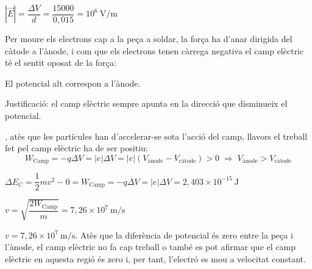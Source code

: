 \begin{solapartat}
 $|\vec{E}| = \dfrac{\Delta V}{d} = \dfrac{15000}{0,015} = 10^{6}\ \mathrm{V/m}$

 Per moure els electrons cap a la peça a soldar, la força ha d'anar dirigida del càtode a l'ànode, i com que els electrons tenen càrrega negativa el camp elèctric té el sentit oposat de la força:


 El potencial alt correspon a l'ànode.

Justificació: el camp elèctric sempre apunta en la direcció que disminueix el potencial.

, atès que les partícules han d'accelerar-se sota l'acció del camp, llavors el treball fet pel camp elèctric ha de ser positiu:
\[ W_\mathrm{Camp} = -q\Delta V = |e|\Delta V = |e|(V_\text{ànode} - V_\text{càtode}) > 0 \;\Rightarrow\; V_\text{ànode} > V_\text{càtode} \]
\end{solapartat}

\begin{solapartat}
 $\Delta E_C = \dfrac{1}{2}mv^2 - 0 = W_\mathrm{Camp} = -q\Delta V = |e|\Delta V = 2,403\times 10^{-15}\ \mathrm{J}$

 $v = \sqrt{\dfrac{2W_\mathrm{Camp}}{m}} = 7,26\times 10^{7}\ \mathrm{m/s}$

 $v = 7,26\times 10^{7}\ \mathrm{m/s}$. Atès que la diferència de potencial és zero entre la peça i l'ànode, el camp elèctric no fa cap treball o també es pot afirmar que el camp elèctric en aquesta regió és zero i, per tant, l'electró es mou a velocitat constant.
\end{solapartat}
